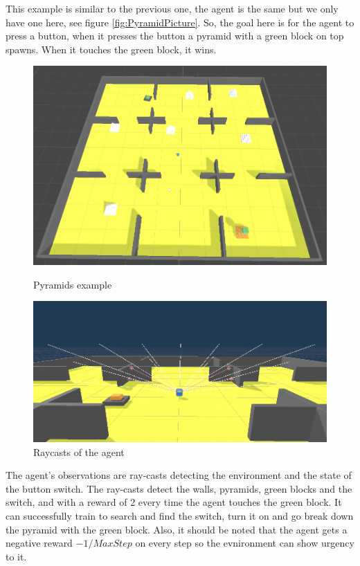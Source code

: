 \documentclass[a4paper,12pt,openright]{book}
\begin{document}
This example is similar to the previous one, the agent is the same but we only have one here, see figure \ref{fig:PyramidPicture}. So, the goal here is for the agent to press a button, when it presses the button a pyramid with a green block on top spawns. When it touches the green block, it wins.

\begin{figure}[ht]
  \includegraphics[width=\linewidth]{Images/PyramidsExample.png}
  \caption{Pyramids example \cite{MLAgents}}\label{fig:PyramidPicture}
\endminipage\hfill
{}
  \includegraphics[width=\linewidth]{Images/PyramidsRaycast.png}
  \caption{Raycasts of the agent}\label{fig:PyramidRaycasts}
\endminipage\hfill
\label{PyradmidsExample}
\end{figure}

The agent's observations are ray-casts detecting the environment and the state of the button switch. The ray-casts detect the walls, pyramids, green blocks and the switch, and with a reward of 2 every time the agent touches the green block. It can successfully train to search and find the switch, turn it on and go break down the pyramid with the green block. Also, it should be noted that the agent gets a negative reward $ -1 / MaxStep $ on every step so the evnironment can show urgency to it.
\end{document}
